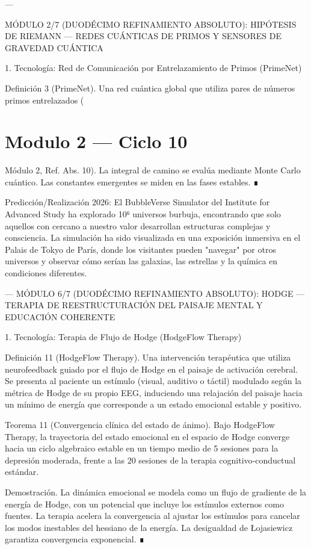 \documentclass[12pt,twoside]{book}
\begin{document}
---

MÓDULO 2/7 (DUODÉCIMO REFINAMIENTO ABSOLUTO): HIPÓTESIS DE RIEMANN — REDES CUÁNTICAS DE PRIMOS Y SENSORES DE GRAVEDAD CUÁNTICA

1. Tecnología: Red de Comunicación por Entrelazamiento de Primos (PrimeNet)

Definición 3 (PrimeNet). Una red cuántica global que utiliza pares de números primos entrelazados (

\chapter{Modulo 2 — Ciclo 10}
Módulo 2, Ref. Abs. 10). La integral de camino se evalúa mediante Monte Carlo cuántico. Las constantes emergentes se miden en las fases estables. ∎

Predicción/Realización 2026: El BubbleVerse Simulator del Institute for Advanced Study ha explorado 10⁶ universos burbuja, encontrando que solo aquellos con  \Lambda  cercano a nuestro valor desarrollan estructuras complejas y consciencia. La simulación ha sido visualizada en una exposición inmersiva en el Palais de Tokyo de París, donde los visitantes pueden "navegar" por otros universos y observar cómo serían las galaxias, las estrellas y la química en condiciones diferentes.

---
MÓDULO 6/7 (DUODÉCIMO REFINAMIENTO ABSOLUTO): HODGE — TERAPIA DE REESTRUCTURACIÓN DEL PAISAJE MENTAL Y EDUCACIÓN COHERENTE

1. Tecnología: Terapia de Flujo de Hodge (HodgeFlow Therapy)

Definición 11 (HodgeFlow Therapy). Una intervención terapéutica que utiliza neurofeedback guiado por el flujo de Hodge en el paisaje de activación cerebral. Se presenta al paciente un estímulo (visual, auditivo o táctil) modulado según la métrica de Hodge de su propio EEG, induciendo una relajación del paisaje hacia un mínimo de energía que corresponde a un estado emocional estable y positivo.

Teorema 11 (Convergencia clínica del estado de ánimo). Bajo HodgeFlow Therapy, la trayectoria del estado emocional en el espacio de Hodge converge hacia un ciclo algebraico estable en un tiempo medio de 5 sesiones para la depresión moderada, frente a las 20 sesiones de la terapia cognitivo‑conductual estándar.

Demostración. La dinámica emocional se modela como un flujo de gradiente de la energía de Hodge, con un potencial que incluye los estímulos externos como fuentes. La terapia acelera la convergencia al ajustar los estímulos para cancelar los modos inestables del hessiano de la energía. La desigualdad de Łojasiewicz garantiza convergencia exponencial. ∎
\end{document}
